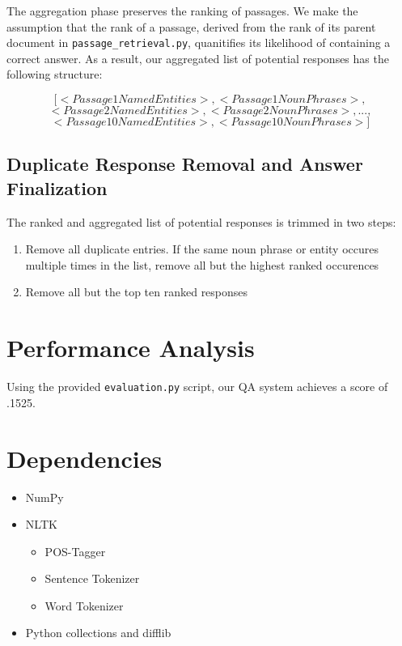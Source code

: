 \documentclass{article}
\begin{document}
The aggregation phase preserves the ranking of passages. We make the assumption that the rank of a passage, derived from the rank of its parent document in \texttt{passage\_retrieval.py}, quanitifies its likelihood of containing a correct answer. As a result, our aggregated list of potential responses has the following structure:

$$
[<Passage 1 Named Entities>, <Passage 1 Noun Phrases>, 
$$
$$
<Passage 2 Named Entities>, <Passage 2 Noun Phrases>, ... , 
$$
$$
<Passage 10 Named Entities>, <Passage 10 Noun Phrases>]
$$

\subsection{Duplicate Response Removal and Answer Finalization}
The ranked and aggregated list of potential responses is trimmed in two steps:
\begin{enumerate}
\item Remove all duplicate entries. If the same noun phrase or entity occures multiple times in the list, remove all but the highest ranked occurences
\item Remove all but the top ten ranked responses
\end{enumerate}

\section{Performance Analysis}
Using the provided \texttt{evaluation.py} script, our QA system achieves a score of .1525. 

\section{Dependencies}
\begin{itemize}
\item NumPy
\item NLTK
	\begin{itemize}
	\item POS-Tagger
	\item Sentence Tokenizer
	\item Word Tokenizer
	\end{itemize}
\item Python collections and difflib
\end{itemize}
\end{document}
